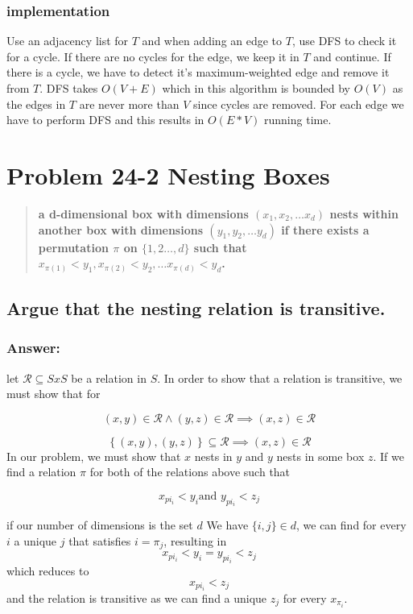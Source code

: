 \documentclass[titlepage]{article}
\theoremstyle{definition}
\begin{document}
  \subsubsection{implementation}
  Use an adjacency list for $T$ and when adding an edge to $T$, use DFS to
  check it for a cycle. If there are no cycles for the edge, we keep it in 
  $T$ and continue. If there is a cycle, we have to detect it's
  maximum-weighted edge and remove it from $T$. DFS takes $O(V+E)$ which in
  this algorithm is bounded by $O(V)$ as the edges in $T$ are never more than
  $V$ since cycles are removed. For each edge we have to perform DFS and this
  results in $O(E*V)$ running time. 



\section{Problem 24-2 Nesting Boxes}
  \begin{quote}
    \textbf{a d-dimensional box with dimensions $(x_1, x_2, \dots x_d)$
    \textbf{nests} within another box with dimensions $(y_1, y_2, \dots y_d)$
    if there exists a permutation $\pi$ on $\{1,2\dots,d\}$ such that 
    $ x_{\pi(1)} < y_1, x_{\pi(2)} < y_2, \dots x_{\pi(d)} < y_d$.  }
  \end{quote}

  \subsection{Argue that the nesting relation is transitive.}
    \subsubsection{Answer:}
      let $\mathcal R \subseteq S x S$ be a relation in $S$. 
      In order to show that a relation is transitive, we must show that  for

      \[ \left({x, y}\right) \in \mathcal R \land \left({y, z}\right) \in \mathcal R \implies \left({x, z}\right) \in \mathcal R \]

      \[ \left\{ {\left({x, y}\right), \left({y, z}\right)}\right\} \subseteq \mathcal R \implies \left({x, z}\right) \in \mathcal R \]
      In our problem, we must show that $x$ nests in $y$ and $y$ nests in some box
      $z$. If we find a relation $\pi$ for both of the relations above such that

      \[ x_{pi_i} < y_i \text{and } y_{pi_i} < z_j \]

      if our number of dimensions is the set $d$
      We have $ \{i,j\} \in d$, we can find for every $i$ a unique $j$ that satisfies
      $i = \pi_j$, resulting in 
      \[ x_{pi_i} < y_i =  y_{pi_i} < z_j \]
      which reduces to 
      \[ x_{pi_i} < z_j \]
      and the relation is transitive as we can find a unique $z_j$ for every
      $x_{\pi_i}$.
\end{document}
